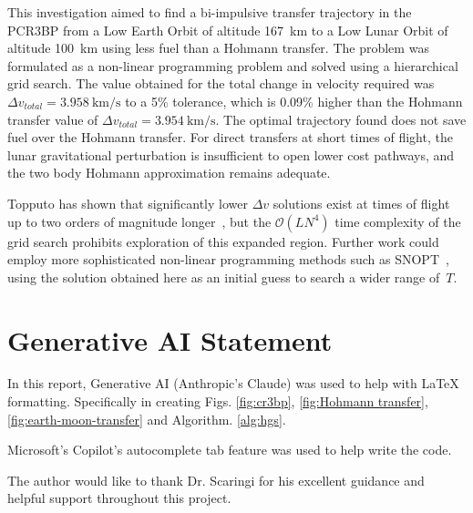 \documentclass[10pt,twocolumn]{revtex4-2}    %
\begin{document}
This investigation aimed to find a bi-impulsive transfer trajectory in the PCR3BP from a Low Earth Orbit of altitude 167~km to a Low Lunar Orbit of altitude 100~km using less fuel than a Hohmann transfer. The problem was formulated as a non-linear programming problem and solved using a hierarchical grid search. The value obtained for the total change in velocity required was $\Delta v_{total} = 3.958~\mathrm{km/s}$ to a 5\% tolerance, which is 0.09\% higher than the Hohmann transfer value of $\Delta v_{total} = 3.954~\mathrm{km/s}$. The optimal trajectory found does not save fuel over the Hohmann transfer. For direct transfers at short times of flight, the lunar gravitational perturbation is insufficient to open lower cost pathways, and the two body Hohmann approximation remains adequate. 

Topputo has shown that significantly lower $\Delta v$ solutions exist at times of flight up to two orders of magnitude longer~\cite{topputo2013}, but the $\mathcal{O}(LN^{4})$ time complexity of the grid search prohibits exploration of this expanded region. Further work could employ more sophisticated non-linear programming methods such as SNOPT~\cite{gill2005}, using the solution obtained here as an initial guess to search a wider range of~$T$.

\section{Generative AI Statement}

In this report, Generative AI (Anthropic's Claude) was used to help with LaTeX formatting. Specifically in creating Figs. \ref{fig:cr3bp}, \ref{fig:Hohmann transfer}, \ref{fig:earth-moon-transfer} and Algorithm. \ref{alg:hgs}.

Microsoft's Copilot's autocomplete tab feature was used to help write the code.

\begin{acknowledgments}

The author would like to thank Dr. Scaringi for his excellent guidance and helpful support throughout this project.    

\end{acknowledgments}
\end{document}
